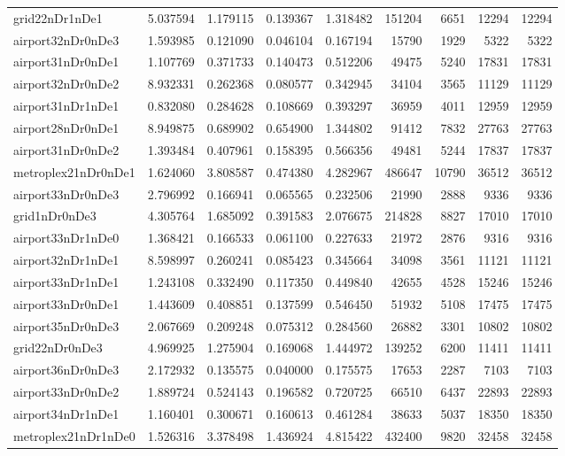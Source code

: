 \begin{longtable}{|l|r|r|r|r|r|r|r|r|}
grid22nDr1nDe1 & 5.037594 & 1.179115 & 0.139367 & 1.318482 & 151204 & 6651 & 12294 & 12294 \\
airport32nDr0nDe3 & 1.593985 & 0.121090 & 0.046104 & 0.167194 & 15790 & 1929 & 5322 & 5322 \\
airport31nDr0nDe1 & 1.107769 & 0.371733 & 0.140473 & 0.512206 & 49475 & 5240 & 17831 & 17831 \\
airport32nDr0nDe2 & 8.932331 & 0.262368 & 0.080577 & 0.342945 & 34104 & 3565 & 11129 & 11129 \\
airport31nDr1nDe1 & 0.832080 & 0.284628 & 0.108669 & 0.393297 & 36959 & 4011 & 12959 & 12959 \\
airport28nDr0nDe1 & 8.949875 & 0.689902 & 0.654900 & 1.344802 & 91412 & 7832 & 27763 & 27763 \\
airport31nDr0nDe2 & 1.393484 & 0.407961 & 0.158395 & 0.566356 & 49481 & 5244 & 17837 & 17837 \\
metroplex21nDr0nDe1 & 1.624060 & 3.808587 & 0.474380 & 4.282967 & 486647 & 10790 & 36512 & 36512 \\
airport33nDr0nDe3 & 2.796992 & 0.166941 & 0.065565 & 0.232506 & 21990 & 2888 & 9336 & 9336 \\
grid1nDr0nDe3 & 4.305764 & 1.685092 & 0.391583 & 2.076675 & 214828 & 8827 & 17010 & 17010 \\
airport33nDr1nDe0 & 1.368421 & 0.166533 & 0.061100 & 0.227633 & 21972 & 2876 & 9316 & 9316 \\
airport32nDr1nDe1 & 8.598997 & 0.260241 & 0.085423 & 0.345664 & 34098 & 3561 & 11121 & 11121 \\
airport33nDr1nDe1 & 1.243108 & 0.332490 & 0.117350 & 0.449840 & 42655 & 4528 & 15246 & 15246 \\
airport33nDr0nDe1 & 1.443609 & 0.408851 & 0.137599 & 0.546450 & 51932 & 5108 & 17475 & 17475 \\
airport35nDr0nDe3 & 2.067669 & 0.209248 & 0.075312 & 0.284560 & 26882 & 3301 & 10802 & 10802 \\
grid22nDr0nDe3 & 4.969925 & 1.275904 & 0.169068 & 1.444972 & 139252 & 6200 & 11411 & 11411 \\
airport36nDr0nDe3 & 2.172932 & 0.135575 & 0.040000 & 0.175575 & 17653 & 2287 & 7103 & 7103 \\
airport33nDr0nDe2 & 1.889724 & 0.524143 & 0.196582 & 0.720725 & 66510 & 6437 & 22893 & 22893 \\
airport34nDr1nDe1 & 1.160401 & 0.300671 & 0.160613 & 0.461284 & 38633 & 5037 & 18350 & 18350 \\
metroplex21nDr1nDe0 & 1.526316 & 3.378498 & 1.436924 & 4.815422 & 432400 & 9820 & 32458 & 32458 \\

\end{longtable}
